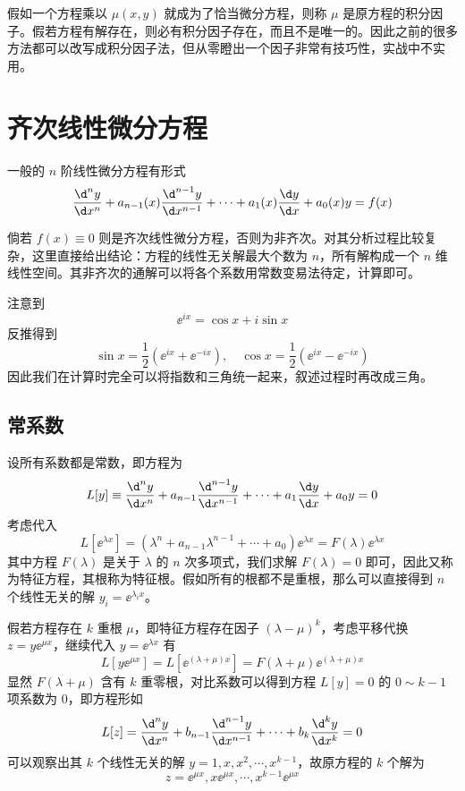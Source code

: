 假如一个方程乘以 $\mu(x, y)$ 就成为了恰当微分方程，则称 $\mu$ 是原方程的积分因子。假若方程有解存在，则必有积分因子存在，而且不是唯一的。因此之前的很多方法都可以改写成积分因子法，但从零瞪出一个因子非常有技巧性，实战中不实用。

\section{齐次线性微分方程}

一般的 $n$ 阶线性微分方程有形式
\[ \frac{\d^n y}{\d x^n} + a_{n-1}(x) \frac{\d^{n-1} y}{\d x^{n-1}} + \cdots + a_1(x) \frac{\d y}{\d x} + a_0(x) y = f(x) \]

倘若 $f(x) \equiv 0$ 则是齐次线性微分方程，否则为非齐次。对其分析过程比较复杂，这里直接给出结论：方程的线性无关解最大个数为 $n$，所有解构成一个 $n$ 维线性空间。其非齐次的通解可以将各个系数用常数变易法待定，计算即可。

注意到
\[ \ee^{i x} = \cos x + i \sin x \]
反推得到
\[ \sin x = \frac{1}{2}(\ee^{i x} + \ee^{-i x}), \quad \cos x = \frac{1}{2} (\ee^{ix} - \ee^{-ix}) \]
因此我们在计算时完全可以将指数和三角统一起来，叙述过程时再改成三角。

\subsection{常系数}

设所有系数都是常数，即方程为
\[ L[y] \equiv \frac{\d^n y}{\d x^n} + a_{n-1} \frac{\d^{n-1} y}{\d x^{n-1}} + \cdots + a_1 \frac{\d y}{\d x} + a_0 y = 0 \]
考虑代入
\[ L[\ee^{\lambda x}] = (\lambda^n + a_{n-1} \lambda^{n-1} + \cdots + a_0) \ee^{\lambda x} = F(\lambda) \ee^{\lambda x} \]
其中方程 $F(\lambda)$ 是关于 $\lambda$ 的 $n$ 次多项式，我们求解 $F(\lambda) = 0$ 即可，因此又称为特征方程，其根称为特征根。假如所有的根都不是重根，那么可以直接得到 $n$ 个线性无关的解 $y_i = \ee^{\lambda_i x}$。

假若方程存在 $k$ 重根 $\mu$，即特征方程存在因子 $(\lambda - \mu)^k$，考虑平移代换 $z = y \ee^{\mu x}$，继续代入 $y = \ee^{\lambda x}$ 有
\[ L[y \ee^{\mu x}] = L[\ee^{(\lambda + \mu) x}] = F(\lambda + \mu) \ee^{(\lambda + \mu) x} \]
显然 $F(\lambda + \mu)$ 含有 $k$ 重零根，对比系数可以得到方程 $L[y] = 0$ 的 $0 \sim k-1$ 项系数为 $0$，即方程形如
\[ L[z] = \frac{\d^n y}{\d x^n} + b_{n-1} \frac{\d^{n-1} y}{\d x^{n-1}} + \cdots + b_{k} \frac{\d^k y}{\d x^k} = 0 \]
可以观察出其 $k$ 个线性无关的解 $y = 1, x, x^2, \cdots, x^{k-1}$，故原方程的 $k$ 个解为
\[ z = \ee^{\mu x}, x \ee^{\mu x}, \cdots, x^{k-1} \ee^{\mu x} \]

